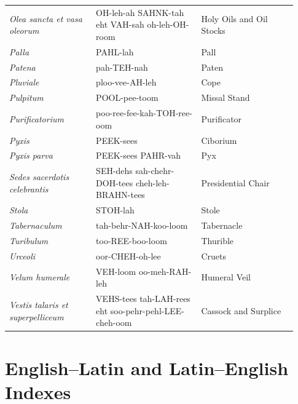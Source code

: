 {\begin{longtable}{>{\raggedright\arraybackslash}p{0.28\linewidth}>{\raggedright\arraybackslash}p{0.34\linewidth}>{\raggedright\arraybackslash}p{0.31\linewidth}}
\textit{Olea sancta et vasa oleorum} & OH-leh-ah SAHNK-tah eht VAH-sah oh-leh-OH-room & Holy Oils and Oil Stocks \\
\textit{Palla} & PAHL-lah & Pall \\
\textit{Patena} & pah-TEH-nah & Paten \\
\textit{Pluviale} & ploo-vee-AH-leh & Cope \\
\textit{Pulpitum} & POOL-pee-toom & Missal Stand \\
\textit{Purificatorium} & poo-ree-fee-kah-TOH-ree-oom & Purificator \\
\textit{Pyxis} & PEEK-sees & Ciborium \\
\textit{Pyxis parva} & PEEK-sees PAHR-vah & Pyx \\
\textit{Sedes sacerdotis celebrantis} & SEH-dehs sah-chehr-DOH-tees cheh-leh-BRAHN-tees & Presidential Chair \\
\textit{Stola} & STOH-lah & Stole \\
\textit{Tabernaculum} & tah-behr-NAH-koo-loom & Tabernacle \\
\textit{Turibulum} & too-REE-boo-loom & Thurible \\
\textit{Urceoli} & oor-CHEH-oh-lee & Cruets \\
\textit{Velum humerale} & VEH-loom oo-meh-RAH-leh & Humeral Veil \\
\textit{Vestis talaris et superpelliceum} & VEHS-tees tah-LAH-rees eht soo-pehr-pehl-LEE-cheh-oom & Cassock and Surplice \\
\bottomrule
\end{longtable}}

\clearpage
\section{English--Latin and Latin--English Indexes}
